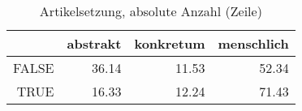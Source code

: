 \begin{table}[ht]
\centering
\begin{tabular}{rrrr}
  \hline
 & abstrakt & konkretum & menschlich \\ 
  \hline
FALSE & 36.14 & 11.53 & 52.34 \\ 
  TRUE & 16.33 & 12.24 & 71.43 \\ 
   \hline
\end{tabular}
\caption{Artikelsetzung, absolute Anzahl (Zeile)} 
\end{table}
